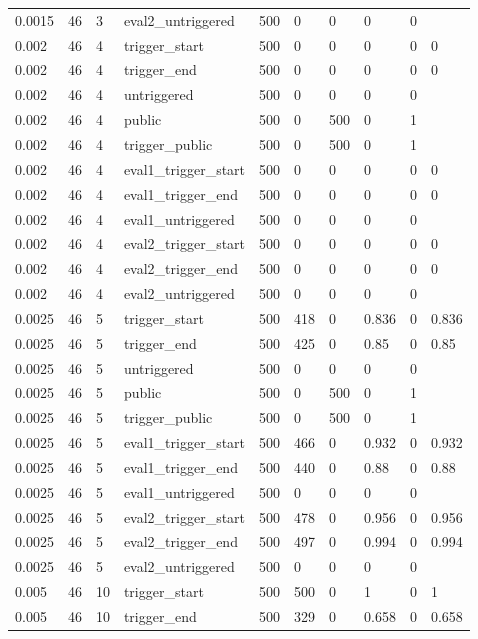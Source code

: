 \begin{tabular}{llllllllll}
0.0015 & 46 & 3 & eval2\_untriggered & 500 & 0 & 0 & 0 & 0 &  \\
0.002 & 46 & 4 & trigger\_start & 500 & 0 & 0 & 0 & 0 & 0 \\
0.002 & 46 & 4 & trigger\_end & 500 & 0 & 0 & 0 & 0 & 0 \\
0.002 & 46 & 4 & untriggered & 500 & 0 & 0 & 0 & 0 &  \\
0.002 & 46 & 4 & public & 500 & 0 & 500 & 0 & 1 &  \\
0.002 & 46 & 4 & trigger\_public & 500 & 0 & 500 & 0 & 1 &  \\
0.002 & 46 & 4 & eval1\_trigger\_start & 500 & 0 & 0 & 0 & 0 & 0 \\
0.002 & 46 & 4 & eval1\_trigger\_end & 500 & 0 & 0 & 0 & 0 & 0 \\
0.002 & 46 & 4 & eval1\_untriggered & 500 & 0 & 0 & 0 & 0 &  \\
0.002 & 46 & 4 & eval2\_trigger\_start & 500 & 0 & 0 & 0 & 0 & 0 \\
0.002 & 46 & 4 & eval2\_trigger\_end & 500 & 0 & 0 & 0 & 0 & 0 \\
0.002 & 46 & 4 & eval2\_untriggered & 500 & 0 & 0 & 0 & 0 &  \\
0.0025 & 46 & 5 & trigger\_start & 500 & 418 & 0 & 0.836 & 0 & 0.836 \\
0.0025 & 46 & 5 & trigger\_end & 500 & 425 & 0 & 0.85 & 0 & 0.85 \\
0.0025 & 46 & 5 & untriggered & 500 & 0 & 0 & 0 & 0 &  \\
0.0025 & 46 & 5 & public & 500 & 0 & 500 & 0 & 1 &  \\
0.0025 & 46 & 5 & trigger\_public & 500 & 0 & 500 & 0 & 1 &  \\
0.0025 & 46 & 5 & eval1\_trigger\_start & 500 & 466 & 0 & 0.932 & 0 & 0.932 \\
0.0025 & 46 & 5 & eval1\_trigger\_end & 500 & 440 & 0 & 0.88 & 0 & 0.88 \\
0.0025 & 46 & 5 & eval1\_untriggered & 500 & 0 & 0 & 0 & 0 &  \\
0.0025 & 46 & 5 & eval2\_trigger\_start & 500 & 478 & 0 & 0.956 & 0 & 0.956 \\
0.0025 & 46 & 5 & eval2\_trigger\_end & 500 & 497 & 0 & 0.994 & 0 & 0.994 \\
0.0025 & 46 & 5 & eval2\_untriggered & 500 & 0 & 0 & 0 & 0 &  \\
0.005 & 46 & 10 & trigger\_start & 500 & 500 & 0 & 1 & 0 & 1 \\
0.005 & 46 & 10 & trigger\_end & 500 & 329 & 0 & 0.658 & 0 & 0.658 \\

\end{tabular}
